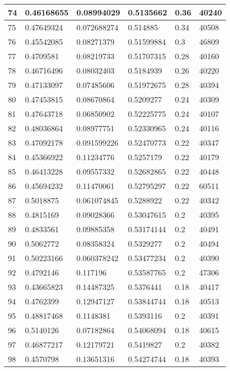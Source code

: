 \begin{longtable}{|l|l|l|l|l|l|}
74 & 0.46168655 & 0.08994029 & 0.5135662 & 0.36 & 40240 \\ \hline 
75 & 0.47649324 & 0.072688274 & 0.514885 & 0.34 & 40508 \\ \hline 
76 & 0.45542085 & 0.08271379 & 0.51599884 & 0.3 & 46809 \\ \hline 
77 & 0.4709581 & 0.08219733 & 0.51707315 & 0.28 & 40160 \\ \hline 
78 & 0.46716496 & 0.08032403 & 0.5184939 & 0.26 & 40220 \\ \hline 
79 & 0.47133097 & 0.07485606 & 0.51972675 & 0.28 & 40394 \\ \hline 
80 & 0.47453815 & 0.08670864 & 0.5209277 & 0.24 & 40309 \\ \hline 
81 & 0.47643718 & 0.06850902 & 0.52225775 & 0.24 & 40107 \\ \hline 
82 & 0.48036864 & 0.08977751 & 0.52330965 & 0.24 & 40116 \\ \hline 
83 & 0.47092178 & 0.091599226 & 0.52470773 & 0.22 & 40347 \\ \hline 
84 & 0.45366922 & 0.11234776 & 0.5257179 & 0.22 & 40179 \\ \hline 
85 & 0.46413228 & 0.09557332 & 0.52682865 & 0.22 & 40448 \\ \hline 
86 & 0.45694232 & 0.11470061 & 0.52795297 & 0.22 & 60511 \\ \hline 
87 & 0.5018875 & 0.061074845 & 0.5288922 & 0.22 & 40342 \\ \hline 
88 & 0.4815169 & 0.09028366 & 0.53047615 & 0.2 & 40395 \\ \hline 
89 & 0.4833561 & 0.09885358 & 0.53174144 & 0.2 & 40491 \\ \hline 
90 & 0.5062772 & 0.08358324 & 0.5329277 & 0.2 & 40494 \\ \hline 
91 & 0.50223166 & 0.060378242 & 0.53477234 & 0.2 & 40390 \\ \hline 
92 & 0.4792146 & 0.117196 & 0.53587765 & 0.2 & 47306 \\ \hline 
93 & 0.43665823 & 0.14487325 & 0.5376441 & 0.18 & 40417 \\ \hline 
94 & 0.4762399 & 0.12947127 & 0.53844744 & 0.18 & 40513 \\ \hline 
95 & 0.48817468 & 0.1148381 & 0.5393116 & 0.2 & 40391 \\ \hline 
96 & 0.5140126 & 0.07182864 & 0.54068094 & 0.18 & 40615 \\ \hline 
97 & 0.46877217 & 0.12179721 & 0.5419827 & 0.2 & 40382 \\ \hline 
98 & 0.4570798 & 0.13651316 & 0.54274744 & 0.18 & 40393 \\ \hline 

\end{longtable}
